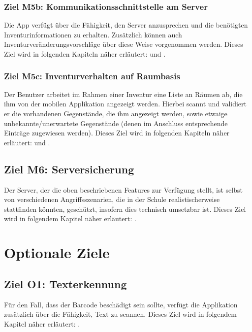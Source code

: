 \documentclass[
    headings=optiontotocandhead,%
    twoside,
    numbers=noenddot,%
    toc=flat, %
    12pt, %
    titlepage, %
    parskip=full, %
    listof=totoc, %
    listof=flat, %
    numbers=noenddot, %
    bibliography=totoc, %
    a4paper,DIV=14,
    BCOR=15mm,
]{scrbook}
\begin{document}
        \subsubsection*{Ziel M5b: Kommunikationsschnittstelle am Server}

        Die App verfügt über die Fähigkeit, den Server anzusprechen und die benötigten Inventurinformationen zu erhalten. Zusätzlich können auch Inventurveränderungsvorschläge über diese Weise vorgenommen werden.
        Dieses Ziel wird in folgenden Kapiteln näher erläutert:  und .
        
        \subsubsection*{Ziel M5c: Inventurverhalten auf Raumbasis}

        Der Benutzer arbeitet im Rahmen einer Inventur eine Liste an Räumen ab, die ihm von der mobilen Applikation angezeigt werden. Hierbei scannt und validiert er die vorhandenen Gegenstände, die ihm angezeigt werden, sowie etwaige unbekannte/unerwartete Gegenstände (denen im Anschluss entsprechende Einträge zugewiesen werden).
        Dieses Ziel wird in folgenden Kapiteln näher erläutert:  und .
     

        \subsection*{Ziel M6: Serversicherung}

        Der Server, der die oben beschriebenen Features zur Verfügung stellt, ist selbst von verschiedenen Angriffsszenarien, die in der Schule realistischerweise stattfinden könnten, geschützt, insofern dies technisch umsetzbar ist. 
        Dieses Ziel wird in folgendem Kapitel näher erläutert: .


\section{Optionale Ziele}


 \subsection*{Ziel O1: Texterkennung}
  Für den Fall, dass der Barcode beschädigt sein sollte, verfügt die Applikation zusätzlich über die Fähigkeit, Text zu scannen.  
  Dieses Ziel wird in folgendem Kapitel näher erläutert: .
\end{document}
